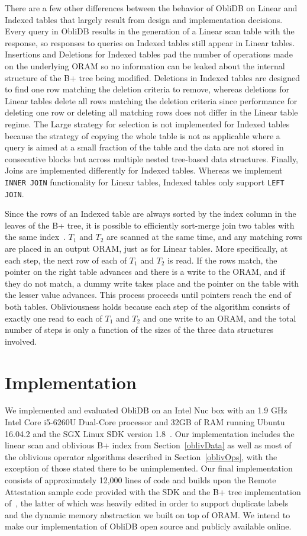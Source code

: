 \documentclass[letterpaper,twocolumn,10pt]{article}
\def\name/{ObliDB}
\begin{document}
There are a few other differences between the behavior of \name/ on Linear and Indexed tables that largely result from design and implementation decisions. Every query in \name/ results in the generation of a Linear scan table with the response, so responses to queries on Indexed tables still appear in Linear tables. Insertions and Deletions for Indexed tables pad the number of operations made on the underlying ORAM so no information can be leaked about the internal structure of the B+ tree being modified. Deletions in Indexed tables are designed to find one row matching the deletion criteria to remove, whereas deletions for Linear tables delete all rows matching the deletion criteria since performance for deleting one row or deleting all matching rows does not differ in the Linear table regime. The Large strategy for selection is not implemented for Indexed tables because the strategy of copying the whole table is not as applicable where a query is aimed at a small fraction of the table and the data are not stored in consecutive blocks but across multiple nested tree-based data structures. Finally, Joins are implemented differently for Indexed tables. Whereas we implement \texttt{INNER JOIN} functionality for Linear tables, Indexed tables only support \texttt{LEFT JOIN}. 

Since the rows of an Indexed table are always sorted by the index column in the leaves of the B+ tree, it is possible to efficiently sort-merge join two tables with the same index~\cite{EN10}. $T_1$ and $T_2$ are scanned at the same time, and any matching rows are placed in an output ORAM, just as for Linear tables. More specifically, at each step, the next row of each of $T_1$ and $T_2$ is read. If the rows match, the pointer on the right table advances and there is a write to the ORAM, and if they do not match, a dummy write takes place and the pointer on the table with the lesser value advances. This process proceeds until pointers reach the end of both tables. Obliviousness holds because each step of the algorithm consists of exactly one read to each of $T_1$ and $T_2$ and one write to an ORAM, and the total number of steps is only a function of the sizes of the three data structures involved.  

\section{Implementation}\label{imp}
We implemented and evaluated \name/ on an Intel Nuc box with an 1.9 GHz Intel Core i5-6260U Dual-Core processor and 32GB of RAM running Ubuntu 16.04.2 and the SGX Linux SDK version 1.8~\cite{SGXRef}. Our implementation includes the linear scan and oblivious B+ index from Section~\ref{oblivData} as well as most of the oblivious operator algorithms described in Section~\ref{oblivOps}, with the exception of those stated there to be unimplemented. Our final implementation consists of approximately 12,000 lines of code and builds upon the Remote Attestation sample code provided with the SDK and the B+ tree implementation of~\cite{BPlus}, the latter of which was heavily edited in order to support duplicate labels and the dynamic memory abstraction we built on top of ORAM. We intend to make our implementation of \name/ open source and publicly available online.
\end{document}
